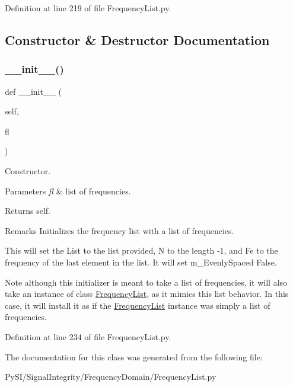 Definition at line 219 of file Frequency\+List.\+py.



\subsection{Constructor \& Destructor Documentation}
\mbox{\label{classSignalIntegrity_1_1FrequencyDomain_1_1FrequencyList_1_1GenericFrequencyList_a9a74e46546d1e8002152b5d0e79786c4}} 
\subsubsection{\texorpdfstring{\+\_\+\+\_\+init\+\_\+\+\_\+()}{\_\_init\_\_()}}
{\footnotesize\ttfamily def \+\_\+\+\_\+init\+\_\+\+\_\+ (\begin{DoxyParamCaption}\item[{}]{self,  }\item[{}]{fl }\end{DoxyParamCaption})}



Constructor. 


\begin{DoxyParams}{Parameters}
{\em fl} & list of frequencies. \\
\hline
\end{DoxyParams}
\begin{DoxyReturn}{Returns}
self. 
\end{DoxyReturn}
\begin{DoxyRemark}{Remarks}
Initializes the frequency list with a list of frequencies.
\end{DoxyRemark}
This will set the List to the list provided, N to the length -\/1, and Fe to the frequency of the last element in the list. It will set m\+\_\+\+Evenly\+Spaced False.

\begin{DoxyNote}{Note}
although this initializer is meant to take a list of frequencies, it will also take an instance of class \hyperlink{classSignalIntegrity_1_1FrequencyDomain_1_1FrequencyList_1_1FrequencyList}{Frequency\+List}, as it mimics this list behavior. In this case, it will install it as if the \hyperlink{classSignalIntegrity_1_1FrequencyDomain_1_1FrequencyList_1_1FrequencyList}{Frequency\+List} instance was simply a list of frequencies. 
\end{DoxyNote}


Definition at line 234 of file Frequency\+List.\+py.



The documentation for this class was generated from the following file\+:\begin{DoxyCompactItemize}
\item 
Py\+S\+I/\+Signal\+Integrity/\+Frequency\+Domain/Frequency\+List.\+py\end{DoxyCompactItemize}
